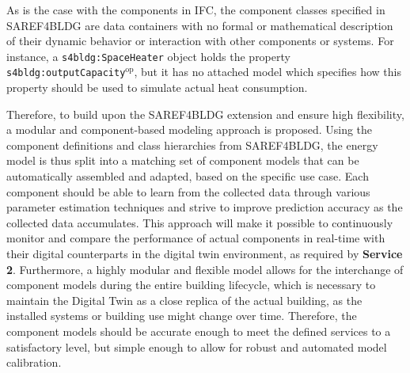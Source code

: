 

As is the case with the components in IFC, the component classes specified in SAREF4BLDG are data containers with no formal or mathematical description of their dynamic behavior or interaction with other components or systems. For instance, a \texttt{s4bldg:SpaceHeater} object holds the property \texttt{s4bldg:outputCapacity$^\textrm{op}$}, but it has no attached model which specifies how this property should be used to simulate actual heat consumption. 

Therefore, to build upon the SAREF4BLDG extension and ensure high flexibility, a modular and component-based modeling approach is proposed. Using the component definitions and class hierarchies from SAREF4BLDG, the energy model is thus split into a matching set of component models that can be automatically assembled and adapted, based on the specific use case. Each component should be able to learn from the collected data through various parameter estimation techniques and strive to improve prediction accuracy as the collected data accumulates. This approach will make it possible to continuously monitor and compare the performance of actual components in real-time with their digital counterparts in the digital twin environment, as required by \textbf{Service 2}. Furthermore, a highly modular and flexible model allows for the interchange of component models during the entire building lifecycle, which is necessary to maintain the Digital Twin as a close replica of the actual building, as the installed systems or building use might change over time. Therefore, the component models should be accurate enough to meet the defined services to a satisfactory level, but simple enough to allow for robust and automated model calibration. 











